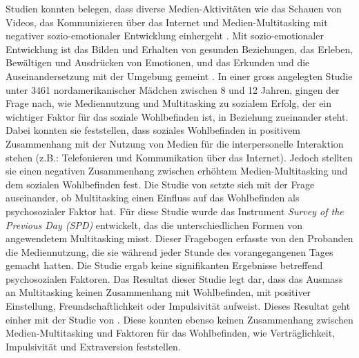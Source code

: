 Studien konnten belegen, dass diverse Medien-Aktivitäten wie das Schauen von Videos, das Kommunizieren über das Internet und Medien-Multitasking mit negativer sozio-emotionaler Entwicklung einhergeht \cite{Funk1996, Rideout2010, Pea2012}. Mit sozio-emotionaler Entwicklung ist das Bilden und Erhalten von gesunden Beziehungen, das Erleben, Bewältigen und Ausdrücken von Emotionen, und das Erkunden und die Auseinandersetzung mit der Umgebung gemeint \cite{Hymes1952, Lerner2000}. In einer gross angelegten Studie unter 3461 nordamerikanischer Mädchen zwischen 8 und 12 Jahren, gingen  der Frage nach, wie Mediennutzung und Multitasking zu sozialem Erfolg, der ein wichtiger Faktor für das soziale Wohlbefinden ist, in Beziehung zueinander steht. Dabei konnten sie feststellen, dass soziales Wohlbefinden in positivem Zusammenhang mit der Nutzung von Medien für die interpersonelle Interaktion stehen (z.B.: Telefonieren und Kommunikation über das Internet). Jedoch stellten sie einen negativen Zusammenhang zwischen erhöhtem Medien-Multitasking und dem sozialen Wohlbefinden fest. Die Studie von  setzte sich mit der Frage auseinander, ob Multitasking einen Einfluss auf das Wohlbefinden als psychosozialer Faktor hat. Für diese Studie wurde das Instrument \textit{Survey of the Previous Day (SPD)} entwickelt, das die unterschiedlichen Formen von angewendetem Multitasking misst. Dieser Fragebogen erfasste von den Probanden die Mediennutzung, die sie während jeder Stunde des vorangegangenen Tages gemacht hatten. Die Studie ergab keine signifikanten Ergebnisse betreffend psychosozialen Faktoren. Das Resultat dieser Studie legt dar, dass das Ausmass an Multitasking keinen Zusammenhang mit Wohlbefinden, mit positiver Einstellung, Freundschaftlichkeit oder Impulsivität aufweist. Dieses Resultat geht einher mit der Studie von . Diese konnten ebenso keinen Zusammenhang zwischen Medien-Multitasking und Faktoren für das Wohlbefinden, wie Verträglichkeit, Impulsivität und Extraversion feststellen.

